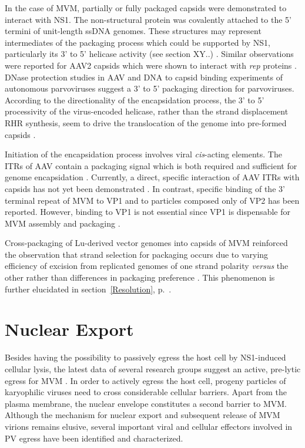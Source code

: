 In the case of MVM, partially or fully packaged capsids were demonstrated to interact with NS1. The non-structural protein was covalently attached to the 5' termini of unit-length ssDNA genomes. These structures may represent intermediates of the packaging process which could be supported by NS1, particularly its 3' to 5' helicase activity (see section XY..) \cite{pmid2527311}. Similar observations were reported for AAV2 capsids which were shown to interact with \textit{rep} proteins \cite{pmid8553536, pmid8995658}. DNase protection studies in AAV \cite{pmid11406604} and DNA to capsid binding experiments of autonomous parvoviruses \cite{pmid2145445, pmid8350419} suggest a 3’ to 5’ packaging direction for parvoviruses. According to the directionality of the encapsidation process, the 3’ to 5’ processivity of the virus-encoded helicase, rather than the strand displacement RHR synthesis, seem to drive the translocation of the genome into pre-formed capsids \cite{pmid11406604}. 

Initiation of the encapsidation process involves viral \textit{cis}-acting elements. The ITRs of AAV contain a packaging signal which is both required and sufficient for genome encapsidation \cite{pmid2547998}. Currently, a direct, specific interaction of AAV ITRs with capsids has not yet been demonstrated \cite{pmid8627687, pmid9060669}. In contrast, specific binding of the 3' terminal repeat of MVM to VP1 \cite{pmid1870193} and to particles composed only of VP2 \cite{pmid8350419} has been reported. However, binding to VP1 is not essential since VP1 is dispensable for MVM assembly and packaging \cite{pmid8416366}.      

Cross-packaging of Lu-derived vector genomes into capsids of MVM reinforced the observation that strand selection for packaging occurs due to varying efficiency of excision from replicated genomes of one strand polarity \textit{versus} the other rather than differences in packaging preference \cite{pmid15866075}. This phenomenon is further elucidated in section~\ref{Resolution}, p.~\pageref{Resolution}.    

\section{Nuclear Export}

Besides having the possibility to passively egress the host cell by NS1-induced cellular lysis, the latest data of several research groups suggest an active, pre-lytic egress for MVM \cite{pmid24068925, pmid18704167, pmid15367635}. In order to actively egress the host cell, progeny particles of karyophilic viruses need to cross considerable cellular barriers. Apart from the plasma membrane, the nuclear envelope constitutes a second barrier to MVM. Although the mechanism for nuclear export and subsequent release of MVM virions remains elusive, several important viral and cellular effectors involved in PV egress have been identified and characterized. 

